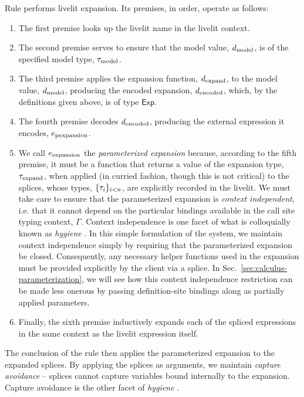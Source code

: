 Rule  performs livelit expansion. Its premises, in order, operate as follows:
\begin{enumerate}
    \item The first premise looks up the livelit name in the livelit context.
    \item The second premise serves to ensure that the model value, $d_\text{model}$, is of the 
    specified model type, $\tau_\text{model}$.
    \item The third premise applies the expansion function, $d_\text{expand}$, to the model value, $d_\text{model}$, 
    producing the encoded expansion, $d_\text{encoded}$, which, by the definitions given above, is of type $\mathsf{Exp}$.
    \item The fourth premise decodes $d_\text{encoded}$, producing the external expression it encodes, $e_\text{pexpansion}$.
    \item We call $e_\text{expansion}$ the \emph{parameterized expansion} because, according to the fifth premise,
    it must be a function that returns a value of the expansion type, $\tau_\text{expand}$, when applied (in curried fashion, though this is not critical)
    to the splices, whose types, $\{\tau_i\}_{i < n}$, are explicitly recorded in the livelit.
    We must take care to ensure that the parameterized expansion is \emph{context independent}, 
    i.e. that it cannot depend on the particular bindings available in the call site typing context, $\Gamma$. 
    Context independence is one facet of what is colloquially known as \emph{hygiene} \cite{TLMs}.
    In this simple formulation of the system, we maintain context independence simply by 
    requiring that the parameterized expansion be 
    closed. Consequently, any necessary helper functions used in the expansion must be provided explicitly by the client 
    via a splice. In Sec.~\ref{sec:calculus-parameterization}, we will see how this context independence 
    restriction can be made 
    less onerous by passing definition-site bindings along as partially applied parameters.
    \item Finally, the sixth premise inductively expands each of the spliced expressions in the same context as the livelit
    expression itself.
\end{enumerate}
The conclusion of the rule then applies the parameterized expansion to the expanded splices. 
By applying the splices as arguments, we maintain \emph{capture avoidance} -- splices cannot capture variables
bound internally to the expansion. Capture avoidance is the other facet of \emph{hygiene} \cite{TLMs}.

